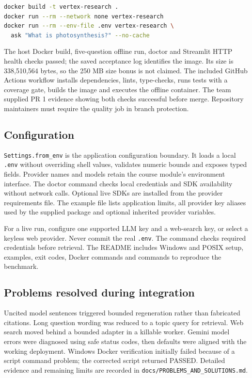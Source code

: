 \documentclass[11pt,a4paper]{article}
\begin{document}
\begin{lstlisting}[style=python,language=bash,numbers=none]
docker build -t vertex-research .
docker run --rm --network none vertex-research
docker run --rm --env-file .env vertex-research \
  ask "What is photosynthesis?" --no-cache
\end{lstlisting}

The host Docker build, five-question offline run, doctor and Streamlit HTTP health checks passed; the saved acceptance log identifies the image. Its size is 338,510,564 bytes, so the 250 MB size bonus is not claimed. The included GitHub Actions workflow installs dependencies, lints, type-checks, runs tests with a coverage gate, builds the image and executes the offline container. The team supplied PR 1 evidence showing both checks successful before merge. Repository maintainers must require the quality job in branch protection.

\subsection{Configuration}
\texttt{Settings.from\_env} is the application configuration boundary. It loads a local \texttt{.env} without overriding shell values, validates numeric bounds and exposes typed fields. Provider names and models retain the course module's environment interface. The doctor command checks local credentials and SDK availability without network calls. Optional live SDKs are installed from the provider requirements file. The example file lists application limits, all provider key aliases used by the supplied package and optional inherited provider variables.

For a live run, configure one supported LLM key and a web-search key, or select a keyless web provider. Never commit the real \texttt{.env}. The command checks required credentials before retrieval. The README includes Windows and POSIX setup, examples, exit codes, Docker commands and commands to reproduce the benchmark.

\subsection{Problems resolved during integration}
Uncited model sentences triggered bounded regeneration rather than fabricated citations. Long question wording was reduced to a topic query for retrieval. Web search moved behind a bounded adapter in a killable worker. Gemini model errors were diagnosed using safe status codes, then defaults were aligned with the working deployment. Windows Docker verification initially failed because of a script command problem; the corrected script returned PASSED. Detailed evidence and remaining limits are recorded in \texttt{docs/PROBLEMS\_AND\_SOLUTIONS.md}.
\end{document}
